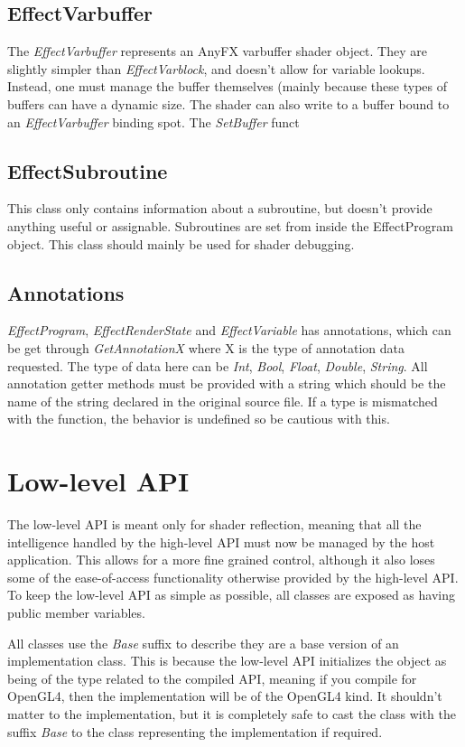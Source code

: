 \documentclass{article}
\begin{document}
\subsection{EffectVarbuffer}
The \textit{EffectVarbuffer} represents an AnyFX varbuffer shader object. They are slightly simpler than \textit{EffectVarblock}, and doesn't allow for variable lookups. Instead, one must manage the buffer themselves (mainly because these types of buffers can have a dynamic size. The shader can also write to a buffer bound to an \textit{EffectVarbuffer} binding spot. The \textit{SetBuffer} funct

\subsection{EffectSubroutine}
This class only contains information about a subroutine, but doesn't provide anything useful or assignable. Subroutines are set from inside the EffectProgram object. This class should mainly be used for shader debugging.

\subsection{Annotations}
\textit{EffectProgram}, \textit{EffectRenderState} and \textit{EffectVariable} has annotations, which can be get through \textit{GetAnnotationX} where X is the type of annotation data requested. The type of data here can be \textit{Int}, \textit{Bool}, \textit{Float}, \textit{Double}, \textit{String}. All annotation getter methods must be provided with a string which should be the name of the string declared in the original source file. If a type is mismatched with the function, the behavior is undefined so be cautious with this. 

\clearpage
\section{Low-level API}
The low-level API is meant only for shader reflection, meaning that all the intelligence handled by the high-level API must now be managed by the host application. This allows for a more fine grained control, although it also loses some of the ease-of-access functionality otherwise provided by the high-level API. To keep the low-level API as simple as possible, all classes are exposed as having public member variables.

All classes use the \textit{Base} suffix to describe they are a base version of an implementation class. This is because the low-level API initializes the object as being of the type related to the compiled API, meaning if you compile for OpenGL4, then the implementation will be of the OpenGL4 kind. It shouldn't matter to the implementation, but it is completely safe to cast the class with the suffix \textit{Base} to the class representing the implementation if required.
\end{document}
